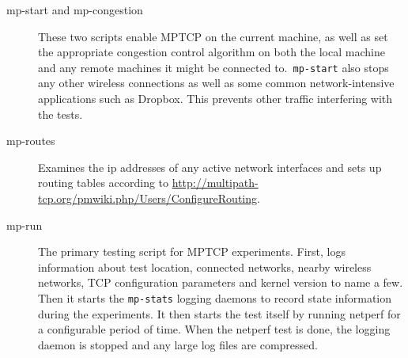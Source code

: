 \begin{description}
  \item[mp-start and mp-congestion]
    These two scripts enable MPTCP on the current machine, as well as set the
    appropriate congestion control algorithm on both the local machine and any
    remote machines it might be connected to.\ \texttt{mp-start} also stops any
    other wireless connections as well as some common network-intensive
    applications such as Dropbox. This prevents other traffic interfering with
    the tests.
  \item[mp-routes]
    Examines the ip addresses of any active network interfaces and sets up
    routing tables according to
    \href{http://multipath-tcp.org/pmwiki.php/Users/ConfigureRouting}{http://multipath-tcp.org/\-pmwiki.php/\-Users/\-ConfigureRouting}.
  \item[mp-run]
    The primary testing script for MPTCP experiments. First, logs information
    about test location, connected networks, nearby wireless networks, TCP
    configuration parameters and kernel version to name a few. Then it starts
    the \texttt{mp-stats} logging daemons to record state information during the
    experiments. It then starts the test itself by running netperf for a
    configurable period of time. When the netperf test is done, the logging
    daemon is stopped and any large log files are compressed.


\end{description}
